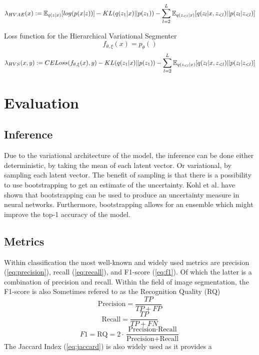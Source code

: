 \begin{equation}
    \lambda_{HVAE}(x) := \operatorname{\mathbb{E}}_{q(z|x)}[log(p(x|z))] - KL(q(z_1|x)||p(z_1)) - \sum_{l=2}^{L} \operatorname{\mathbb{E}}_{q(z_{<l}|x)}[q(z_l| x, z_{<l}) ||p(z_l|z_{<l})]
\end{equation}


Loss function for the Hierarchical Variational Segmenter
\begin{equation}
    f_{\theta, \xi}(x) = p_\theta()
\end{equation}
\begin{equation}
    \lambda_{HVS}(x, y) := CELoss(f_{\theta, \xi}(x), y) - KL(q(z_1|x)||p(z_1)) - \sum_{l=2}^{L} \operatorname{\mathbb{E}}_{q(z_{<l}|x)}[q(z_l| x, z_{<l}) ||p(z_l|z_{<l})]
\end{equation}

\section{Evaluation}

\subsection{Inference}
Due to the variational architecture of the model, the inference can be done either deterministic, by taking the mean of each latent vector. Or variational, by sampling each latent vector. The benefit of sampling is that there is a possibility to use bootstrapping to get an estimate of the uncertainty. Kohl et al. \cite{kohl2018probabilistic} have shown that bootstrapping can be used to produce an uncertainty measure in neural networks. Furthermore, bootstrapping allows for an ensemble which might improve the top-1 accuracy of the model.


\subsection{Metrics}
Within classification the most well-known and widely used metrics are precision (\ref{eq:precision}), recall (\ref{eq:recall}), and F1-score (\ref{eq:f1})\cite{rijsbergen1979information}. Of which the latter is a combination of precision and recall. Within the field of image segmentation, the F1-score is also Sometimes refered to as the Recognition Quality (RQ)
\begin{equation}
    \label{eq:precision}
    \text{Precision} = \frac{TP}{TP + FP}
\end{equation}
\begin{equation}
    \label{eq:recall}
    \text{Recall} = \frac{TP}{TP + FN}
\end{equation}
\begin{equation}
    \label{eq:f1}
    F1 = \text{RQ} = 2 \cdot \frac{\text{Precision} \cdot \text{Recall}}{\text{Precision} + \text{Recall}}
\end{equation}
The Jaccard Index (\ref{eq:jaccard}) is also widely used as it provides a 

